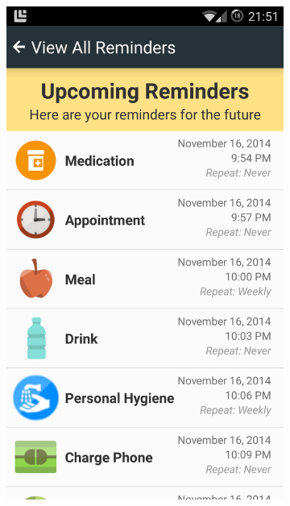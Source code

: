 \begin{figure}[]
    \centering
    \begin{subfigure}[t]{0.48\textwidth}
        \centering
       \includegraphics[width=\textwidth]{Files/treatment-study-1/figures/app-reminderslist}
        \caption{}
        \label{fig: taut-reminderslist}
    \end{subfigure}
    \hfill
     \begin{subfigure}[t]{0.48\textwidth}
        \centering

\end{subfigure}
\end{figure}
